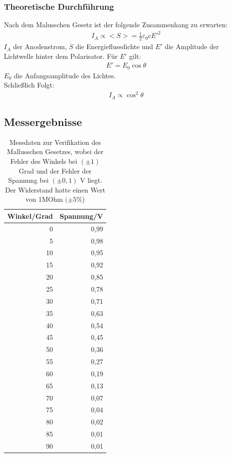 \documentclass[12pt]{scrartcl}
\begin{document}
\subsubsection{Theoretische Durchführung}
Nach dem Malusschen Gesetz ist der folgende Zusammenhang zu erwarten:
\begin{align}
I_A \propto <S> = \frac{1}{2} \varepsilon_0 c E'^2
\end{align}
$I_A$ der Anodenstrom, $S$ die Energieflussdichte und $E'$ die Amplitude der Lichtwelle hinter dem Polarisator.
Für $E'$ gilt:
\begin{align}
E' = E_0 \cos{\theta}
\end{align}
$E_0$ die Anfangsamplitude des Lichtes.\\
Schließlich Folgt:
\begin{align}
I_A \propto \cos^2{\theta}
\label{eqn:a_1}
\end{align}
\subsection{Messergebnisse}
\begin{table}[H]
\caption{Messdaten zur Verifikation des Mallusschen Gesetzes, wobei der Fehler des Winkels bei $(\pm 1)$ Grad  und der Fehler der Spannung bei $(\pm 0,1)$ V liegt. Der Widerstand hatte einen Wert von 1MOhm $(\pm 5$\%)}
\begin{center}
\begin{tabular}{|r|r|}
\hline
\multicolumn{1}{|l|}{Winkel/Grad} & \multicolumn{1}{l|}{Spannung/V} \\ \hline
0 & 0,99 \\ \hline
5 & 0,98 \\ \hline
10 & 0,95 \\ \hline
15 & 0,92 \\ \hline
20 & 0,85 \\ \hline
25 & 0,78 \\ \hline
30 & 0,71 \\ \hline
35 & 0,63 \\ \hline
40 & 0,54 \\ \hline
45 & 0,45 \\ \hline
50 & 0,36 \\ \hline
55 & 0,27 \\ \hline
60 & 0,19 \\ \hline
65 & 0,13 \\ \hline
70 & 0,07 \\ \hline
75 & 0,04 \\ \hline
80 & 0,02 \\ \hline
85 & 0,01 \\ \hline
90 & 0,01 \\ \hline
\end{tabular}
\end{center}
\label{tab:a_1}
\end{table}
\end{document}
